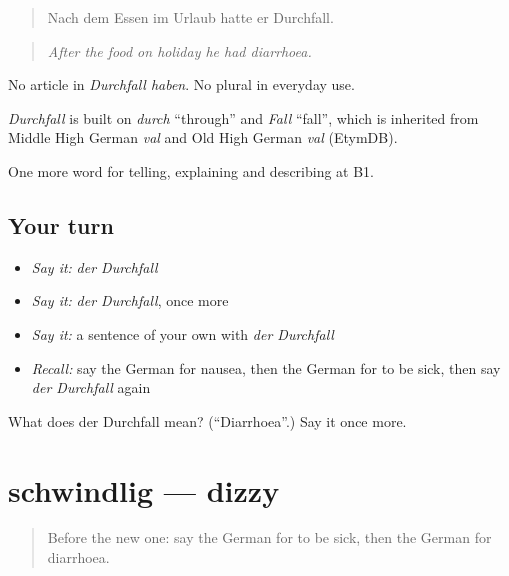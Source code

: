 \begin{quote}
Nach dem Essen im Urlaub hatte er Durchfall.
\end{quote}

\begin{quote}
\emph{After the food on holiday he had diarrhoea.}
\end{quote}

No article in \emph{Durchfall haben}. No plural in everyday use.

\begin{cousinweb}
\emph{Durchfall} is built on \emph{durch} \textquotedblleft{}through\textquotedblright{} and \emph{Fall} \textquotedblleft{}fall\textquotedblright{}, which is inherited from Middle High German \emph{val} and Old High German \emph{val} (EtymDB).
\end{cousinweb}

\begin{grammarlens}[title={What you've built}]
One more word for telling, explaining and describing at B1.
\end{grammarlens}

\subsection*{Your turn}
\begin{itemize}
\raggedright
  \item \emph{Say it:} \emph{der Durchfall}
  \item \emph{Say it:} \emph{der Durchfall}, once more
  \item \emph{Say it:} a sentence of your own with \emph{der Durchfall}
  \item \emph{Recall:} say the German for nausea, then the German for to be sick, then say \emph{der Durchfall} again
\end{itemize}

\begin{tcolorbox}[breakable,colback=teal!4,colframe=teal!35!black,title={Before you move on}]
What does der Durchfall mean? (\textquotedblleft{}Diarrhoea\textquotedblright{}.) Say it once more.
\end{tcolorbox}
\section[schwindlig]{schwindlig — dizzy}

\label{lesson:GE-C480-schwindlig}



\begin{quote}
Before the new one: say the German for to be sick, then the German for diarrhoea.
\end{quote}

